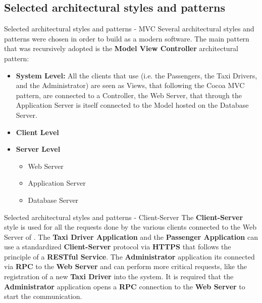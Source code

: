 \documentclass{../common/latex_classes/pdf_presentation}
\begin{document}
	\subsection{Selected architectural styles and patterns}
	\begin{frame}{Selected architectural styles and patterns - MVC}
		Several architectural styles and patterns were chosen in order to build \myTaxiService{} as a modern software.
		The main pattern that was recursively adopted is the \textbf{Model View Controller} architectural pattern:
		\begin{itemize}
			\item \textbf{System Level:} All the clients that use \myTaxiService{} (i.e. the Passengers, the Taxi Drivers, and the Administrator) are seen as Views, that following the Cocoa MVC pattern, are connected to a Controller, the Web Server, that through the Application Server is itself connected to the Model hosted on the Database Server.
			\item \textbf{Client Level}
			\item \textbf{Server Level}
			\begin{itemize}
				\item Web Server
				\item Application Server
				\item Database Server
			\end{itemize}
		\end{itemize}
	\end{frame}
	
	\begin{frame}{Selected architectural styles and patterns - Client-Server}
		The \textbf{Client-Server} style is used for all the requests done by the various clients connected to the Web Server of \myTaxiService{}.
		The \textbf{Taxi Driver Application} and the \textbf{Passenger Application} can use a standardized \textbf{Client-Server} protocol via \textbf{HTTPS} that follows the principle of a \textbf{RESTful Service}.
		The \textbf{Administrator} application its connected via \textbf{RPC} to the \textbf{Web Server} and can perform more critical requests, like the registration of a new \textbf{Taxi Driver} into the system.
		It is required that the \textbf{Administrator} application opens a \textbf{RPC} connection to the \textbf{Web Server} to start the communication.
	\end{frame}
	
\end{document}
